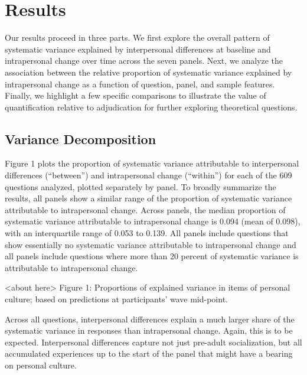 \documentclass[
  11pt,
]{article}
\begin{document}
\hypertarget{results}{%
\section{Results}\label{results}}

Our results proceed in three parts. We first explore the overall pattern
of systematic variance explained by interpersonal differences at
baseline and intrapersonal change over time across the seven panels.
Next, we analyze the association between the relative proportion of
systematic variance explained by intrapersonal change as a function of
question, panel, and sample features. Finally, we highlight a few
specific comparisons to illustrate the value of quantification relative
to adjudication for further exploring theoretical questions.

\hypertarget{variance-decomposition}{%
\subsection{Variance Decomposition}\label{variance-decomposition}}

Figure 1 plots the proportion of systematic variance attributable to
interpersonal differences (``between'') and intrapersonal change
(``within'') for each of the 609 questions analyzed, plotted separately
by panel. To broadly summarize the results, all panels show a similar
range of the proportion of systematic variance attributable to
intrapersonal change. Across panels, the median proportion of systematic
variance attributable to intrapersonal change is 0.094 (mean of 0.098),
with an interquartile range of 0.053 to 0.139. All panels include
questions that show essentially no systematic variance attributable to
intrapersonal change and all panels include questions where more than 20
percent of systematic variance is attributable to intrapersonal change.

\begin{center}
<about here>
Figure 1: Proportions of explained variance in items of personal culture; based on predictions at participants' wave mid-point.
\end{center}

Across all questions, interpersonal differences explain a much larger
share of the systematic variance in responses than intrapersonal change.
Again, this is to be expected. Interpersonal differences capture not
just pre-adult socialization, but all accumulated experiences up to the
start of the panel that might have a bearing on personal culture.
\end{document}
